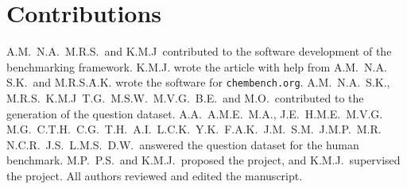 \documentclass[11pt, oneside]{article}
\begin{document}


\section*{Contributions}
A.M.\, N.A.\, M.R.S.\ and K.M.J\ contributed to the software development of the benchmarking framework. K.M.J. wrote the article with help from A.M.\, N.A.\, S.K.\ and M.R.S.\. A.K. wrote the software for \texttt{chembench.org}.
A.M.\, N.A.\, S.K., M.R.S.\, K.M.J\, T.G.\, M.S.W.\, M.V.G.\, B.E.\ and M.O.\ contributed to the generation of the question dataset. A.A.\, A.M.E.\, M.A., J.E.\, H.M.E.\, M.V.G.\, M.G.\, C.T.H.\, C.G.\, T.H.\, A.I.\, L.C.K.\, Y.K.\, F.A.K.\, J.M.\, S.M.\, J.M.P.\, M.R.\, N.C.R.\, J.S.\, L.M.S.\, D.W.\ answered the question dataset for the human benchmark.
M.P.\, P.S.\ and K.M.J.\ proposed the project, and K.M.J.\ supervised the project. All authors reviewed and edited the manuscript.
\clearpage

\end{document}
